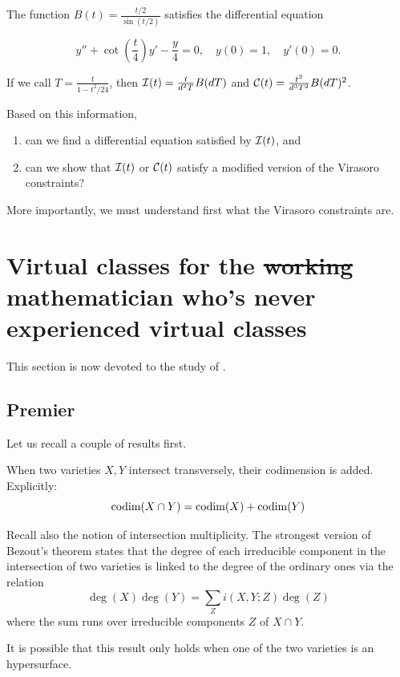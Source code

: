 \documentclass[12pt]{memoir}
\begin{document}
The function \(B(t)=\frac{t/2}{\sin(t/2)}\) satisfies the differential equation

\[
    y''+\cot\left(\frac{t}{4}\right)y'-\frac{y}{4}=0,\quad y(0)=1,\quad y'(0)=0.
\]

If we call \(T=\frac{t}{1-t^2/24}\), then \(\mathcal{I}(t)=\frac{t}{d^2T}B(dT)\) and \(\mathcal{C}(t)=\frac{t^2}{d^3T^2}B(dT)^2\).

\begin{Qn}
    Based on this information,
    \begin{enumerate}
        \item can we find a differential equation satisfied by \(\mathcal{I}(t)\), and
        \item can we show that \(\mathcal{I}(t)\) or \(\mathcal{C}(t)\) satisfy a modified version of the Virasoro constraints?
    \end{enumerate}
    More importantly, we must understand first what the Virasoro constraints are.
\end{Qn}

\section{Virtual classes for the \st{working} mathematician who's never experienced virtual classes}

This section is now devoted to the study of \cite{VFCWorkMath}.

\subsection{Premier}

Let us recall a couple of results first.

\begin{Prop}
    When two varieties \(X,Y\) intersect transversely, their codimension is added. Explicitly:
    \[    \operatorname{codim}(X\cap Y)=\operatorname{codim}(X)+\operatorname{codim}(Y)
    \]
\end{Prop}

Recall also the notion of intersection multiplicity. The strongest version of Bezout's theorem states that the degree of each irreducible component in the intersection of two varieties is linked to the degree of the ordinary ones via the relation
\[\deg(X)\deg(Y)=\sum_Z i(X,Y;Z)\deg(Z)\]
where the sum runs over irreducible components \(Z\) of \(X\cap Y\).

\begin{Rmk}
    It is possible that this result only holds when one of the two varieties is an hypersurface. 
\end{Rmk}
\end{document}
